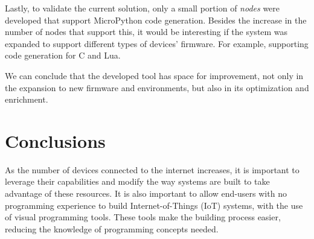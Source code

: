 Lastly, to validate the current solution, only a small portion of \textit{nodes} were developed that support MicroPython code generation. Besides the increase in the number of nodes that support this, it would be interesting if the system was expanded to support different types of devices' firmware. For example, supporting code generation for C and Lua.

We can conclude that the developed tool has space for improvement, not only in the expansion to new firmware and environments, but also in its optimization and enrichment.





\section{Conclusions}\label{sec:conclusion_conclusions}

As the number of devices connected to the internet increases, it is important to leverage their capabilities and modify the way systems are built to take advantage of these resources. It is also important to allow end-users with no programming experience to build Internet-of-Things (IoT) systems, with the use of visual programming tools. These tools make the building process easier, reducing the knowledge of programming concepts needed.

